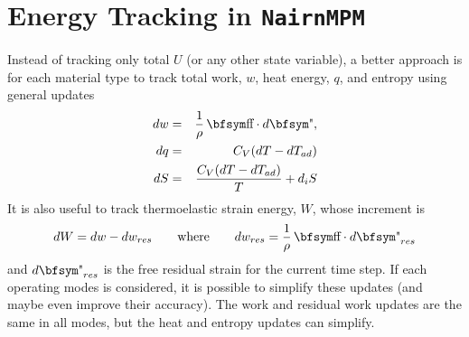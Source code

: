 \documentclass[11pt]{book}
\def\st{{\hbox{\bfsym\char'033}}}
\def\et{{\hbox{\bfsym\char'042}}}
\begin{document}
\section{Energy Tracking in {\tt NairnMPM}\label{EnergyUpdates}}

Instead of tracking only total $U$ (or any other state variable), a better approach is for each material type to track total work, $w$,  heat energy, $q$, and entropy using general updates
\begin{eqnarray}
           dw & = & {1\over \rho}\thinspace \st\cdot d\et, \\
           dq & = & C_V (dT - dT_{ad})  \\
           dS & = & {C_V (dT - dT_{ad})\over T} + d_iS
\end{eqnarray}
It is also useful to track thermoelastic strain energy, $W$, whose increment is
\begin{equation}
     dW = dw - dw_{res} \qquad {\rm where} \qquad dw_{res} = {1\over \rho}\thinspace \st\cdot d\et_{res}
\end{equation}
and $d\et_{res}$ is the free residual strain for the current time step.
If each operating modes is considered, it is possible to simplify these updates (and maybe even improve their accuracy). The work and residual work updates are the same in all modes, but the heat and entropy updates can simplify.
\end{document}
